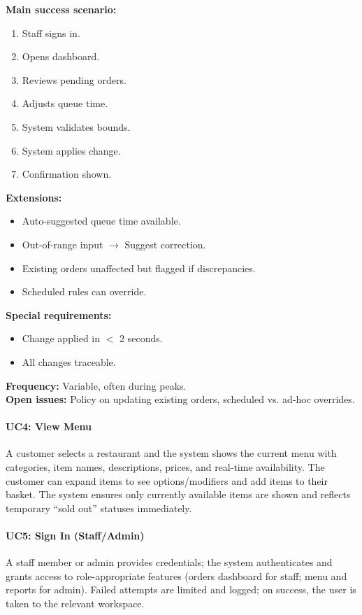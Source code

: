 \documentclass{article}
\begin{document}
\textbf{Main success scenario:}
\begin{enumerate}
    \item Staff signs in.
    \item Opens dashboard.
    \item Reviews pending orders.
    \item Adjusts queue time.
    \item System validates bounds.
    \item System applies change.
    \item Confirmation shown.
\end{enumerate}

\textbf{Extensions:}
\begin{itemize}
    \item Auto-suggested queue time available.
    \item Out-of-range input $\rightarrow$ Suggest correction.
    \item Existing orders unaffected but flagged if discrepancies.
    \item Scheduled rules can override.
\end{itemize}

\textbf{Special requirements:}
\begin{itemize}
    \item Change applied in $<$ 2 seconds.
    \item All changes traceable.
\end{itemize}

\textbf{Frequency:} Variable, often during peaks.\\
\textbf{Open issues:} Policy on updating existing orders, scheduled vs. ad-hoc overrides.

\newpage

\paragraph{UC4: View Menu}  
A customer selects a restaurant and the system shows the current menu with categories, item names, descriptions, prices, and real-time availability. The customer can expand items to see options/modifiers and add items to their basket. The system ensures only currently available items are shown and reflects temporary “sold out” statuses immediately.

\paragraph{UC5: Sign In (Staff/Admin)}  
A staff member or admin provides credentials; the system authenticates and grants access to role-appropriate features (orders dashboard for staff; menu and reports for admin). Failed attempts are limited and logged; on success, the user is taken to the relevant workspace.
\end{document}
